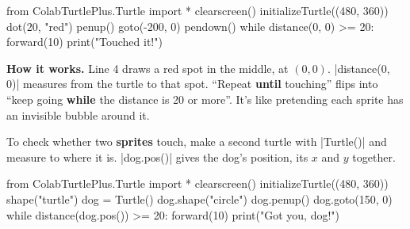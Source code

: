 \begin{tcbraster}[raster columns=2, raster equal height=rows, raster column skip=12pt, raster valign=center, raster force size=false, raster column 1/.style={width=0.36\linewidth}, raster column 2/.style={width=0.64\linewidth-12pt}]
\begin{tcolorbox}[colback=white, colframe=white, boxrule=0pt, valign=center, left=0pt, right=0pt]
\begin{scratch}
\end{scratch}
\end{tcolorbox}
\begin{code}
from ColabTurtlePlus.Turtle import *
clearscreen()
initializeTurtle((480, 360))
dot(20, "red")
penup()
goto(-200, 0)
pendown()
while distance(0, 0) >= 20:
    forward(10)
print("Touched it!")
\end{code}
\end{tcbraster}

\textbf{How it works.} Line 4 draws a red spot in the middle, at $(0, 0)$. \py|distance(0, 0)| measures from the turtle to that spot. ``Repeat \textbf{until} touching'' flips into ``keep going \textbf{while} the distance is 20 or more''. It's like pretending each sprite has an invisible bubble around it.

To check whether two \textbf{sprites} touch, make a second turtle with \py|Turtle()| and measure to where it is. \py|dog.pos()| gives the dog's position, its $x$ and $y$ together.

\begin{tcbraster}[raster columns=2, raster equal height=rows, raster column skip=12pt, raster valign=center, raster force size=false, raster column 1/.style={width=0.36\linewidth}, raster column 2/.style={width=0.64\linewidth-12pt}]
\begin{tcolorbox}[colback=white, colframe=white, boxrule=0pt, valign=center, left=0pt, right=0pt]
\begin{scratch}
\end{scratch}
\end{tcolorbox}
\begin{code}
from ColabTurtlePlus.Turtle import *
clearscreen()
initializeTurtle((480, 360))
shape("turtle")
dog = Turtle()
dog.shape("circle")
dog.penup()
dog.goto(150, 0)
while distance(dog.pos()) >= 20:
    forward(10)
print("Got you, dog!")
\end{code}
\end{tcbraster}


